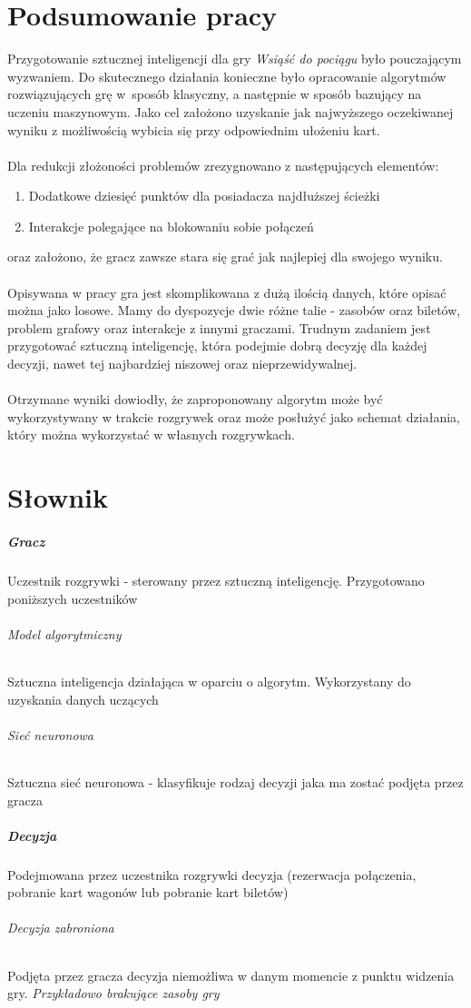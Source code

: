 \documentclass[12pt, oneside]{report}
\begin{document}
\chapter{Podsumowanie pracy}
Przygotowanie sztucznej inteligencji dla gry \textit{Wsiąść do pociągu} było pouczającym wyzwaniem. Do skutecznego działania konieczne było opracowanie algorytmów rozwiązujących grę w~sposób klasyczny, a następnie w sposób bazujący na uczeniu maszynowym. Jako cel założono uzyskanie jak najwyższego oczekiwanej wyniku z możliwością wybicia się przy odpowiednim ułożeniu kart. \\ \\ 
Dla redukcji złożoności problemów zrezygnowano z następujących elementów:
\begin{enumerate}
	\item Dodatkowe dziesięć punktów dla posiadacza najdłuższej ścieżki
	\item Interakcje polegające na blokowaniu sobie połączeń
\end{enumerate}
oraz założono, że gracz zawsze stara się grać jak najlepiej dla swojego wyniku. \\ \\  
Opisywana w pracy gra jest skomplikowana z dużą ilością danych, które opisać można jako losowe. Mamy do dyspozycje dwie różne talie - zasobów oraz biletów, problem grafowy oraz interakcje z innymi graczami. Trudnym zadaniem jest przygotować sztuczną inteligencję, która podejmie dobrą decyzję dla każdej decyzji, nawet tej najbardziej niszowej oraz nieprzewidywalnej. \\ \\ 
Otrzymane wyniki dowiodły, że zaproponowany algorytm może być wykorzystywany w trakcie rozgrywek oraz może posłużyć jako schemat działania, który można wykorzystać w własnych rozgrywkach. 
\chapter{Słownik}
\label{chap:dictionary}
\paragraph{Gracz}
Uczestnik rozgrywki - sterowany przez sztuczną inteligencję. Przygotowano poniższych uczestników
\subparagraph{Model algorytmiczny} Sztuczna inteligencja działająca w oparciu o algorytm. Wykorzystany do uzyskania danych uczących
\subparagraph{Sieć neuronowa} Sztuczna sieć neuronowa - klasyfikuje rodzaj decyzji jaka ma zostać podjęta przez gracza
\paragraph{Decyzja}
Podejmowana przez uczestnika rozgrywki decyzja (rezerwacja połączenia, pobranie kart wagonów lub pobranie kart biletów)
\subparagraph{Decyzja zabroniona}
Podjęta przez gracza decyzja niemożliwa w danym momencie z punktu widzenia gry. \textit{Przykładowo brakujące zasoby gry}
\end{document}
